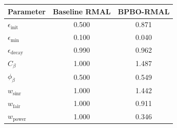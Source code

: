 \begin{tabular}{lcc}
\hline
\textbf{Parameter} & \textbf{Baseline RMAL} & \textbf{BPBO-RMAL} \\
\hline
$\epsilon_{\text{init}}$ & 0.500 & 0.871 \\
$\epsilon_{\min}$ & 0.100 & 0.040 \\
$\epsilon_{\text{decay}}$ & 0.990 & 0.962 \\
$C_\beta$ & 1.000 & 1.487 \\
$\phi_\beta$ & 0.500 & 0.549 \\
$w_{\text{sinr}}$ & 1.000 & 1.442 \\
$w_{\text{fair}}$ & 1.000 & 0.911 \\
$w_{\text{power}}$ & 1.000 & 0.346 \\
\hline
\end{tabular}